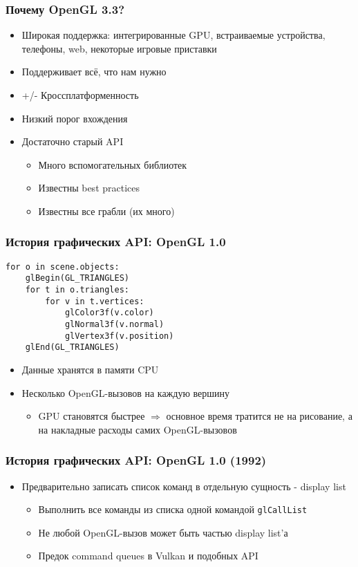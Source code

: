 \documentclass{beamer}
\begin{document}
\begin{frame}
\frametitle{Почему OpenGL 3.3?}
\pause
\begin{itemize}
\item Широкая поддержка: интегрированные GPU, встраиваемые устройства, телефоны, web, некоторые игровые приставки
\pause
\item Поддерживает всё, что нам нужно
\pause
\item +/- Кроссплатформенность
\pause
\item Низкий порог вхождения
\pause
\item Достаточно старый API
\begin{itemize}
\item Много вспомогательных библиотек
\item Известны best practices
\item Известны все грабли \pause (их много)
\end{itemize}
\end{itemize}
\end{frame}

\begin{frame}[fragile]
\frametitle{История графических API: OpenGL 1.0}
\begin{verbatim}
for o in scene.objects:
    glBegin(GL_TRIANGLES)
    for t in o.triangles:
        for v in t.vertices:
            glColor3f(v.color)
            glNormal3f(v.normal)
            glVertex3f(v.position)
    glEnd(GL_TRIANGLES)
\end{verbatim}
\pause
\begin{itemize}
\item Данные хранятся в памяти CPU
\pause
\item Несколько OpenGL-вызовов на каждую вершину
\pause
\begin{itemize}
\item GPU становятся быстрее $\Longrightarrow$ основное время тратится не на рисование, а на накладные расходы самих OpenGL-вызовов
\end{itemize}
\end{itemize}
\end{frame}

\begin{frame}[fragile]
\frametitle{История графических API: OpenGL 1.0 (1992)}
\begin{itemize}
\item Предварительно записать список команд в отдельную сущность - display list
\begin{itemize}
\item Выполнить все команды из списка одной командой \verb|glCallList|
\item Не любой OpenGL-вызов может быть частью display list'а
\item Предок command queues в Vulkan и подобных API
\end{itemize}
\end{itemize}
\end{frame}
\end{document}
